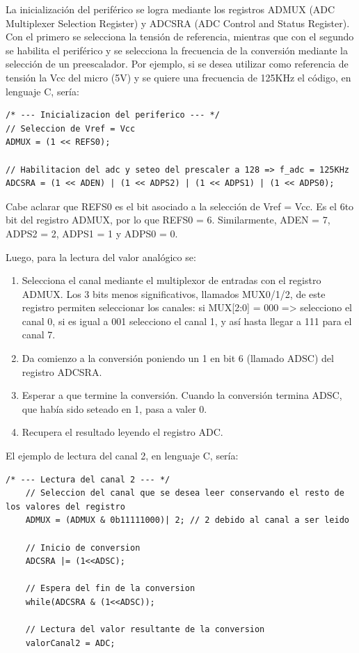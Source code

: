 La inicialización del periférico se logra mediante los registros ADMUX (ADC Multiplexer Selection Register) y ADCSRA (ADC Control and Status Register). Con el primero se selecciona la tensión de referencia, mientras que con el segundo se habilita el periférico y se selecciona la frecuencia de la conversión mediante la selección de un preescalador. Por ejemplo, si se desea utilizar como referencia de tensión la Vcc del micro (5V) y se quiere una frecuencia de 125KHz el código, en lenguaje C, sería:
\begin{lstlisting}[style=CStyle]
/* --- Inicializacion del periferico --- */
// Seleccion de Vref = Vcc
ADMUX = (1 << REFS0);

// Habilitacion del adc y seteo del prescaler a 128 => f_adc = 125KHz
ADCSRA = (1 << ADEN) | (1 << ADPS2) | (1 << ADPS1) | (1 << ADPS0); 
\end{lstlisting}
Cabe aclarar que REFS0 es el bit asociado a la selección de Vref = Vcc. Es el 6to bit del registro ADMUX, por lo que REFS0 = 6. Similarmente, ADEN = 7, ADPS2 = 2, ADPS1 = 1 y ADPS0 = 0.

Luego, para la lectura del valor analógico se:
\begin{enumerate}
	\item Selecciona el canal mediante el multiplexor de entradas con el registro ADMUX. Los 3 bits menos significativos, llamados MUX0/1/2, de este registro permiten seleccionar los canales: si MUX[2:0] = 000 => selecciono el canal 0, si es igual a 001 selecciono el canal 1, y así hasta llegar a 111 para el canal 7.

	\item Da comienzo a la conversión poniendo un 1 en bit 6 (llamado ADSC) del registro ADCSRA.
	\item Esperar a que termine la conversión. Cuando la conversión termina ADSC, que había sido seteado en 1, pasa a valer 0.
	\item Recupera el resultado leyendo el registro ADC.
\end{enumerate}

El ejemplo de lectura del canal 2, en lenguaje C, sería:
\begin{lstlisting}[style=CStyle]
	/* --- Lectura del canal 2 --- */
	// Seleccion del canal que se desea leer conservando el resto de los valores del registro
	ADMUX = (ADMUX & 0b11111000)| 2; // 2 debido al canal a ser leido
	
	// Inicio de conversion
	ADCSRA |= (1<<ADSC);
	
	// Espera del fin de la conversion
	while(ADCSRA & (1<<ADSC));
	
	// Lectura del valor resultante de la conversion
	valorCanal2 = ADC;
\end{lstlisting}

